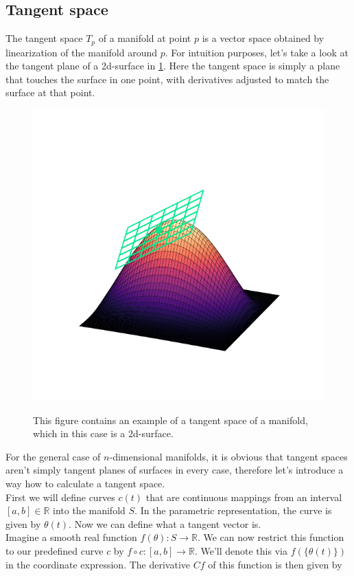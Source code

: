 \subsection{Tangent space}
The tangent space $T_p$ of a manifold at point $p$ is a vector space obtained by linearization of the manifold around $p$. For intuition purposes, let's take a look at the tangent plane of a 2d-surface in \cref{fig:TangentSpacePlot}. Here the tangent space is simply a plane that touches the surface in one point, with derivatives adjusted to match the surface at that point.
\begin{figure}
	\centering
	\includegraphics[width = 12cm, clip, trim= 0cm 1.5cm 0cm 2cm]{text/FisherInformation/plots/TangentSpacePlot.pdf}
	\label{fig:TangentSpacePlot}
	\caption{This figure contains an example of a tangent space of a manifold, which in this case is a 2d-surface.}
\end{figure}
For the general case of $n$-dimensional manifolds, it is obvious that tangent spaces aren't simply tangent planes of surfaces in every case, therefore let's introduce a way how to calculate a tangent space.\\
First we will define curves $c(t)$ that are continuous mappings from an interval $[a,b] \in \mathbb{R}$ into the manifold $S$. In the parametric representation, the curve is given by $\theta(t)$. Now we can define what a tangent vector is.\\
Imagine a smooth real function $f(\theta): S \rightarrow \mathbb{R}$. We can now restrict this function to our predefined curve $c$ by $f \circ c : [a,b] \rightarrow \mathbb{R}$. We'll denote this via $f\left(\{\theta(t)\}\right)$ in the coordinate expression. The derivative $Cf$ of this function is then given by 
